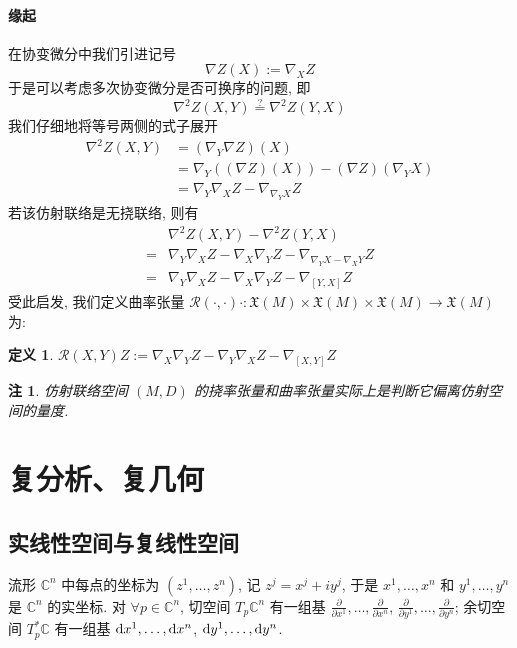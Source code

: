 \documentclass{book}
\newtheorem{definition}[theorem]{\indent 定义}
\newtheorem*{remark}{\indent 注}
\newcommand{\md}{{\rm d}}
\newcommand{\pd}[2]{\frac{\partial #1}{\partial #2}}
\begin{document}
    \subsubsection{缘起}
        在协变微分中我们引进记号
        \begin{equation*}
            \nabla Z(X) :=\nabla_X{Z}
        \end{equation*}
        于是可以考虑多次协变微分是否可换序的问题, 即
        \begin{equation*}
            \nabla^2Z(X,Y) \stackrel{?}{=} \nabla^2Z(Y,X)
        \end{equation*}
        我们仔细地将等号两侧的式子展开
        \begin{align*}
            \nabla^2Z(X,Y) &= (\nabla_Y\nabla Z)(X) \\
            &= \nabla_Y((\nabla Z)(X)) - (\nabla Z)(\nabla_Y{X}) \\
            &= \nabla_Y\nabla_X{Z}-\nabla_{\nabla_Y{X}}Z
        \end{align*}
        若该仿射联络是无挠联络, 则有
        \begin{align*}
            & \nabla^2Z(X,Y) - \nabla^2Z(Y,X) \\
            =& \nabla_Y\nabla_X{Z}-\nabla_X\nabla_Y{Z}-\nabla_{\nabla_Y{X}-\nabla_X{Y}}Z \\
            =& \nabla_Y\nabla_X{Z}-\nabla_X\nabla_Y{Z}-\nabla_{[Y,X]}Z
        \end{align*}
        受此启发, 我们定义曲率张量 $\mathcal{R}(\cdot,\cdot)\cdot:\mathfrak{X}(M)\times\mathfrak{X}(M)\times\mathfrak{X}(M)\rightarrow\mathfrak{X}(M)$ 为:
        \begin{definition}
            $\mathcal{R}(X,Y)Z := \nabla_X\nabla_Y{Z} - \nabla_Y\nabla_X{Z} - \nabla_{[X,Y]}Z$
        \end{definition}
        
        \begin{remark}
            仿射联络空间 $(M,D)$ 的挠率张量和曲率张量实际上是判断它偏离仿射空间的量度.
        \end{remark}

    \chapter{复分析、复几何}
    \section{实线性空间与复线性空间}
        流形 $\mathbb{C}^n$ 中每点的坐标为 $(z^1,\dots,z^n)$, 记 $z^j=x^j+iy^j$, 于是 $x^1,\dots,x^n$ 和 $y^1,\dots,y^n$ 是 $\mathbb{C}^n$ 的实坐标.
        对 $\forall p\in\mathbb{C}^n$, 切空间 $T_p\mathbb{C}^n$ 有一组基 $\pd{}{x^1},\dots,\pd{}{x^n}$, $\pd{}{y^1},\dots,\pd{}{y^n}$; 余切空间 $T^*_p\mathbb{C}$
        有一组基 $\md x^1,\dots,\md x^n$, $\md y^1,\dots,\md y^n$.
\end{document}
